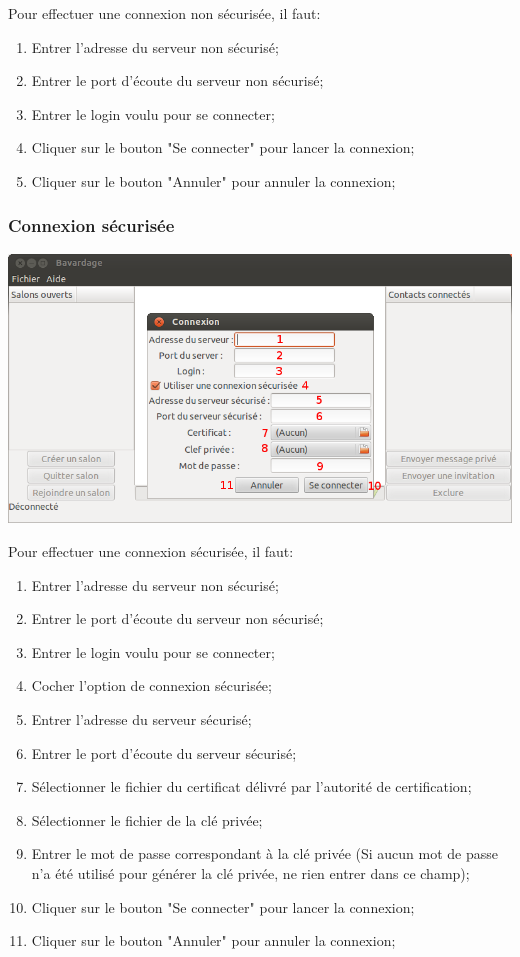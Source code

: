 \documentclass[a4paper,11pt,french]{book}
\begin{document}
Pour effectuer une connexion non sécurisée, il faut:
\begin{enumerate}
    \item Entrer l'adresse du serveur non sécurisé;
    \item Entrer le port d'écoute du serveur non sécurisé;
    \item Entrer le login voulu pour se connecter;
    \item Cliquer sur le bouton "Se connecter" pour lancer la connexion;
    \item Cliquer sur le bouton "Annuler" pour annuler la connexion;
\end{enumerate}

\subsubsection{Connexion sécurisée}

\includegraphics[width=40em]{capture/con_sec.png}

Pour effectuer une connexion sécurisée, il faut:

\begin{enumerate}
    \item Entrer l'adresse du serveur non sécurisé;
    \item Entrer le port d'écoute du serveur non sécurisé;
    \item Entrer le login voulu pour se connecter;
    \item Cocher l'option de connexion sécurisée;
    \item Entrer l'adresse du serveur sécurisé;
    \item Entrer le port d'écoute du serveur sécurisé;
    \item Sélectionner le fichier du certificat délivré par l'autorité de certification;
    \item Sélectionner le fichier de la clé privée;
    \item Entrer le mot de passe correspondant à la clé privée (Si aucun mot de passe n'a été utilisé pour générer la clé privée, ne rien entrer dans ce champ);
    \item Cliquer sur le bouton "Se connecter" pour lancer la connexion;
    \item Cliquer sur le bouton "Annuler" pour annuler la connexion;
\end{enumerate}
\newpage
\end{document}
